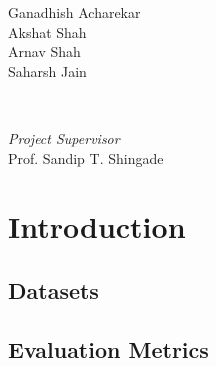\documentclass[]{article}
\begin{document}
\begin{titlepage}
	\begin{minipage}{0.4\textwidth}
		\begin{flushleft}
			\large
			Ganadhish Acharekar\\
			Akshat Shah\\
			Arnav Shah\\
			Saharsh Jain
		\end{flushleft}
	\end{minipage}
	~
	\begin{minipage}{0.4\textwidth}
		\begin{flushright}
			\large
			\textit{Project Supervisor}\\
			Prof. Sandip T. Shingade
		\end{flushright}
	\end{minipage}
	
	
	
	
	
	
	 
	
	\vfill %
	
\end{titlepage}
\newpage
\tableofcontents
\newpage

\section{Introduction}




\subsection{Datasets}

\subsection{Evaluation Metrics}

\end{document}
